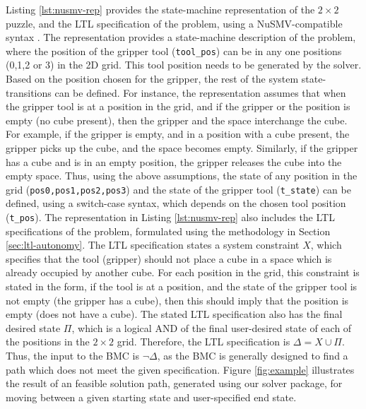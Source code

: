 \documentclass[3p,twocolumn,times,procedia]{elsarticle}
\begin{document}
Listing \ref{lst:nusmv-rep} provides the state-machine representation of the $2\times 2$ puzzle, and the LTL specification of the problem, using a NuSMV-compatible syntax \cite{nusmv2}. The representation provides a state-machine description of the problem, where the position of the gripper tool (\texttt{tool\_pos}) can be in any one positions (0,1,2 or 3) in the 2D grid. This tool position needs to be generated by the solver. Based on the position chosen for the gripper, the rest of the system state-transitions can be defined. For instance, the representation assumes that when the gripper tool is at a position in the grid, and if the gripper or the position is empty (no cube present), then the gripper and the space interchange the cube. For example, if the gripper is empty, and in a position with a cube present, the gripper picks up the cube, and the space becomes empty. Similarly, if the gripper has a cube and is in an empty position, the gripper releases the cube into the empty space. Thus, using the above assumptions, the state of any position in the grid (\texttt{pos0,pos1,pos2,pos3}) and the state of the gripper tool (\texttt{t\_state}) can be defined, using a switch-case syntax, which depends on the chosen tool position (\texttt{t\_pos}). {\newline}
The representation in Listing \ref{lst:nusmv-rep} also includes the LTL specifications of the problem, formulated using the methodology in Section \ref{sec:ltl-autonomy}. The LTL specification states a system constraint $X$, which specifies that the tool (gripper) should not place a cube in a space which is already occupied by another cube. For each position in the grid, this constraint is stated in the form, if the tool is at a position, and the state of the gripper tool is not empty (the gripper has a cube), then this should imply that the position is empty (does not have a cube). The stated LTL specification also has the final desired state $\Pi$, which is a logical AND of the final user-desired state of each of the positions in the $2\times 2$ grid. Therefore, the LTL specification is $\Delta = X \cup \Pi$. Thus, the input to the BMC is $\neg \Delta$, as the BMC is generally designed to find a path which does not meet the given specification. Figure \ref{fig:example} illustrates the result of an feasible solution path, generated using our solver package, for moving between a given starting state and user-specified end state.
\end{document}
